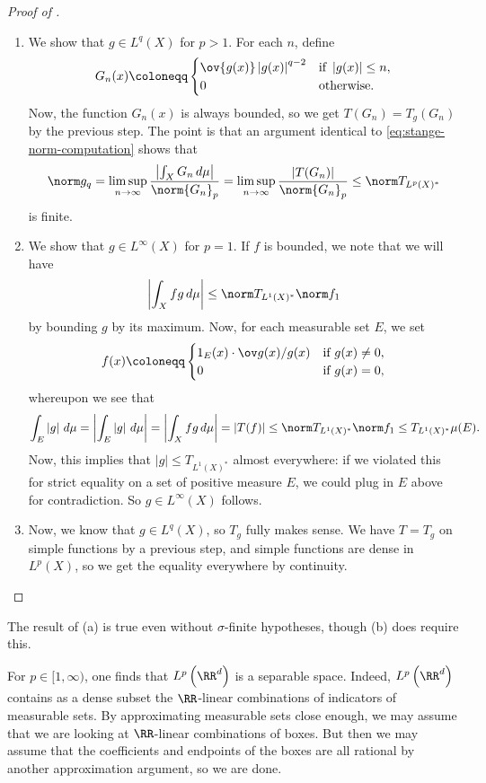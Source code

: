 \documentclass[../notes.tex]{subfiles}
\begin{document}
\begin{proof}[Proof of ]
\begin{enumerate}
		\item We show that $g\in L^q(X)$ for $p>1$. For each $n$, define
		\[G_n(x)\coloneqq\begin{cases}
			\ov{g(x)}\left|g(x)\right|^{q-2} & \text{if }\left|g(x)\right|\le n, \\
			0 & \text{otherwise}.
		\end{cases}\]
		Now, the function $G_n(x)$ is always bounded, so we get $T(G_n)=T_g(G_n)$ by the previous step. The point is that an argument identical to \eqref{eq:stange-norm-computation} shows that
		\[\norm g_q=\limsup_{n\to\infty}\frac{\left|\int_XG_n\,d\mu\right|}{\norm{G_n}_p}=\limsup_{n\to\infty}\frac{\left|T(G_n)\right|}{\norm{G_n}_p}\le\norm T_{L^p(X)^*}\]
		is finite.

		\item We show that $g\in L^\infty(X)$ for $p=1$. If $f$ is bounded, we note that we will have
		\[\left|\int_Xfg\,d\mu\right|\le\norm T_{L^1(X)^*}\norm f_1\]
		by bounding $g$ by its maximum. Now, for each measurable set $E$, we set
		\[f(x)\coloneqq\begin{cases}
			1_E(x)\cdot\ov g(x)/g(x) & \text{if }g(x)\ne0, \\
			0 & \text{if }g(x)=0,
		\end{cases}\]
		whereupon we see that
		\[\int_E\left|g\right|\,d\mu=\left|\int_E\left|g\right|\,d\mu\right|=\left|\int_Xfg\,d\mu\right|=\left|T(f)\right|\le\norm T_{L^1(X)^*}\norm f_1\le T_{L^1(X)^*}\mu(E).\]
		Now, this implies that $\left|g\right|\le T_{L^1(X)^*}$ almost everywhere: if we violated this for strict equality on a set of positive measure $E$, we could plug in $E$ above for contradiction. So $g\in L^\infty(X)$ follows.

		\item Now, we know that $g\in L^q(X)$, so $T_g$ fully makes sense. We have $T=T_g$ on simple functions by a previous step, and simple functions are dense in $L^p(X)$, so we get the equality everywhere by continuity.
		\qedhere
	\end{enumerate}
\end{proof}
\begin{remark}
	The result of (a) is true even without $\sigma$-finite hypotheses, though (b) does require this.
\end{remark}
\begin{remark}
	For $p\in[1,\infty)$, one finds that $L^p\left(\RR^d\right)$ is a separable space. Indeed, $L^p\left(\RR^d\right)$ contains as a dense subset the $\RR$-linear combinations of indicators of measurable sets. By approximating measurable sets close enough, we may assume that we are looking at $\RR$-linear combinations of boxes. But then we may assume that the coefficients and endpoints of the boxes are all rational by another approximation argument, so we are done.
\end{remark}
\end{document}

